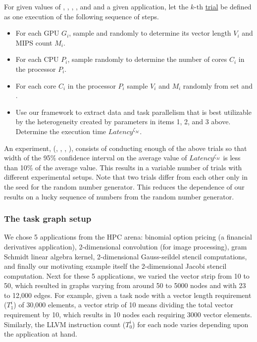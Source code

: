 For given values of \numtplgynodes, \gpunum, \veclenset, \corenumset,
and \mipsset and a given application, let the $k$-th \ul{trial} be
defined as one execution of the following sequence of steps.

\begin{itemize}

\item For each GPU $G_i$, sample \veclenset and \mipsset randomly to
  determine its vector length $V_i$ and MIPS count $M_i$. \label{i1}

\item For each CPU $P_i$, sample \corenumset randomly to determine the
  number of cores $C_i$ in the processor $P_i$.~\label{i2}

\item For each core $C_i$ in the processor $P_i$ sample $V_i$ and $M_i$
  randomly from set \veclenset and \mipsset.

\item Use our framework to extract data and task parallelism that is
  best utilizable by the heterogeneity created by parameters in items 1,
  2, and 3 above. Determine the execution time
  $Latency^{\zeta_\mathcal{M}}$.

\end{itemize}

An experiment, \expt(\numtplgynodes, \gpunum, \veclenset, \corenumset
\mipsset), consists of conducting enough of the above trials so that
width of the 95\% confidence interval on the average value of
$Latency^{\zeta_\mathcal{M}}$ is less than 10\% of the average
value. This results in a variable number of trials with different
experimental setups. Note that two trials differ from each other only in
the seed for the random number generator.  This reduces the dependence
of our results on a lucky sequence of numbers from the random number
generator.

\subsubsection{The task graph setup}
\label{sec:task-graph-setup}

We chose 5 applications from the HPC arena: binomial option pricing (a
financial derivatives application), 2-dimensional convolution (for image
processing), gram Schmidt linear algebra kernel, 2-dimensional
Gauss-seildel stencil computations, and finally our motivating example
itself the 2-dimensional Jacobi stencil computation. Next for these 5
applications, we varied the vector strip from 10 to 50, which resulted
in graphs varying from around 50 to 5000 nodes and with 23 to 12,000
edges. For example, given a task node with a vector length requirement
($T^i_1$) of 30,000 elements, a vector strip of 10 means dividing the
total vector requirement by 10, which results in 10 nodes each requiring
3000 vector elements. Similarly, the LLVM instruction count ($T^i_0$)
for each node varies depending upon the application at hand.

